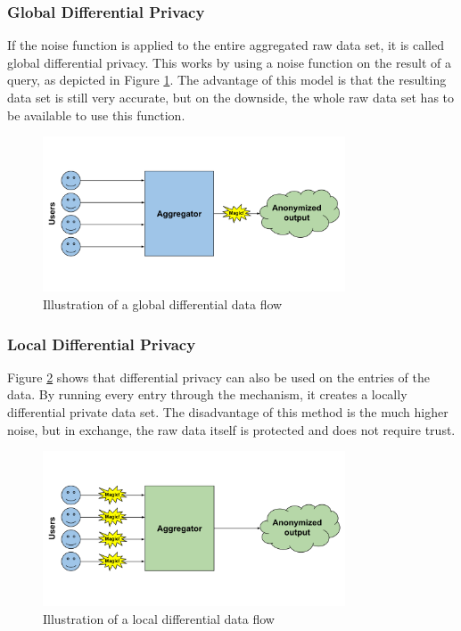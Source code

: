 \subsubsection{Global Differential Privacy}

If the noise function is applied to the entire aggregated raw data set, it is called global differential privacy. This works by using a noise function on the result of a query, as depicted in Figure \ref{fig:global_diff}. The advantage of this model is that the resulting data set is still very accurate, but on the downside, the whole raw data set has to be available to use this function.

\begin{figure}[htpb]
  \centering
  \includegraphics[width=0.8\textwidth]{figures/global_diff.png}
  \caption{Illustration of a global differential data flow\cite{desfontaines}}
  \label{fig:global_diff}
\end{figure}

\subsubsection{Local Differential Privacy}
Figure \ref{fig:local_diff} shows that differential privacy can also be used on the entries of the data. By running every entry through the mechanism, it creates a locally differential private data set. The disadvantage of this method is the much higher noise, but in exchange, the raw data itself is protected and does not require trust.

\begin{figure}[htpb]
  \centering
  \includegraphics[width=0.8\textwidth]{figures/local_diff.png}
  \caption{Illustration of a local differential data flow \cite{desfontaines}} 
  \label{fig:local_diff}
\end{figure}

